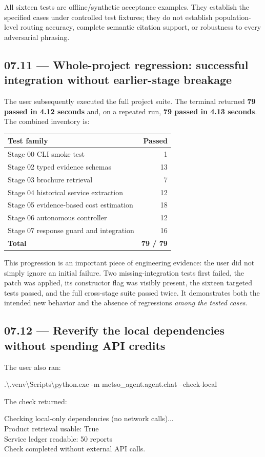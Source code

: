 \documentclass[11pt,a4paper]{article}
\begin{document}
All sixteen tests are offline/synthetic acceptance examples. They establish the specified cases under controlled test fixtures; they do not establish population-level routing accuracy, complete semantic citation support, or robustness to every adversarial phrasing.

\subsection{07.11 --- Whole-project regression: successful integration without earlier-stage breakage}
The user subsequently executed the full project suite. The terminal returned \textbf{79 passed in 4.12 seconds} and, on a repeated run, \textbf{79 passed in 4.13 seconds}. The combined inventory is:
\begin{tabularx}{\textwidth}{@{}Y r@{}}
\toprule
\textbf{Test family} & \textbf{Passed}\\\midrule
Stage 00 CLI smoke test & 1\\
Stage 02 typed evidence schemas & 13\\
Stage 03 brochure retrieval & 7\\
Stage 04 historical service extraction & 12\\
Stage 05 evidence-based cost estimation & 18\\
Stage 06 autonomous controller & 12\\
Stage 07 response guard and integration & 16\\\midrule
\textbf{Total} & \textbf{79 / 79}\\\bottomrule
\end{tabularx}

This progression is an important piece of engineering evidence: the user did not simply ignore an initial failure. Two missing-integration tests first failed, the patch was applied, its constructor flag was visibly present, the sixteen targeted tests passed, and the full cross-stage suite passed twice. It demonstrates both the intended new behavior and the absence of regressions \emph{among the tested cases}.

\subsection{07.12 --- Reverify the local dependencies without spending API credits}
The user also ran:
\begin{examplebox}
\footnotesize\ttfamily
.\textbackslash.venv\textbackslash Scripts\textbackslash python.exe -m\newline
\hspace*{2em}metso\_agent.agent.chat --check-local
\end{examplebox}
The check returned:
\begin{examplebox}
\footnotesize\ttfamily
Checking local-only dependencies (no network calls)...\\
Product retrieval usable: True\\
Service ledger readable: 50 reports\\
Check completed without external API calls.
\end{examplebox}
\end{document}
